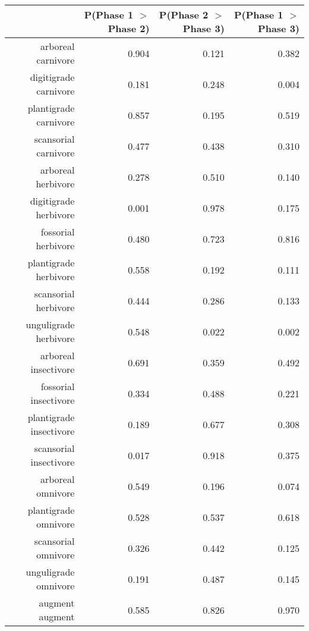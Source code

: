 \begin{table}[ht]
\centering
\begin{tabular}{rrrr}
  \hline
 & P(Phase 1 $>$ Phase 2) & P(Phase 2 $>$ Phase 3) & P(Phase 1 $>$ Phase 3) \\ 
  \hline
arboreal carnivore & 0.904 & 0.121 & 0.382 \\ 
  digitigrade carnivore & 0.181 & 0.248 & 0.004 \\ 
  plantigrade carnivore & 0.857 & 0.195 & 0.519 \\ 
  scansorial carnivore & 0.477 & 0.438 & 0.310 \\ 
  arboreal herbivore & 0.278 & 0.510 & 0.140 \\ 
  digitigrade herbivore & 0.001 & 0.978 & 0.175 \\ 
  fossorial herbivore & 0.480 & 0.723 & 0.816 \\ 
  plantigrade herbivore & 0.558 & 0.192 & 0.111 \\ 
  scansorial herbivore & 0.444 & 0.286 & 0.133 \\ 
  unguligrade herbivore & 0.548 & 0.022 & 0.002 \\ 
  arboreal insectivore & 0.691 & 0.359 & 0.492 \\ 
  fossorial insectivore & 0.334 & 0.488 & 0.221 \\ 
  plantigrade insectivore & 0.189 & 0.677 & 0.308 \\ 
  scansorial insectivore & 0.017 & 0.918 & 0.375 \\ 
  arboreal omnivore & 0.549 & 0.196 & 0.074 \\ 
  plantigrade omnivore & 0.528 & 0.537 & 0.618 \\ 
  scansorial omnivore & 0.326 & 0.442 & 0.125 \\ 
  unguligrade omnivore & 0.191 & 0.487 & 0.145 \\ 
  augment augment & 0.585 & 0.826 & 0.970 \\ 
   \hline
\end{tabular}
\label{tab:surv_plant}
\end{table}
